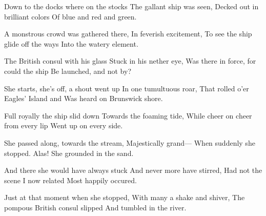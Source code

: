 \documentclass[11pt, a5paper, openright]{book}
\begin{document}
\begin{centering}
  Down to the docks where on the stocks\newline
  The gallant ship was seen,\newline
  Decked out in brilliant colors\newline
  Of blue and red and green.\par

  A monstrous crowd was gathered there,\newline
  In feverish excitement,\newline
  To see the ship glide off the ways\newline
  Into the watery element.\par

  The British consul with his glass\newline
  Stuck in his nether eye,
  Was there in force, for could the ship\newline
  Be launched, and not by?\par

  She starts, she's off, a shout went up\newline
  In one tumultuous roar,\newline
  That rolled o'er Eagles' Island and\newline
  Was heard on Brunswick shore.\par

  Full royally the ship slid down\newline
  Towards the foaming tide,\newline
  While cheer on cheer from every lip\newline
  Went up on every side.\par

  She passed along, towards the stream,\newline
  Majestically grand---\newline
  When suddenly she stopped.  Alas!\newline
  She grounded in the sand.\par

  And there she would have always stuck\newline
  And never more have stirred,\newline
  Had not the scene I now related\newline
  Most happily occured.\par

  Just at that moment when she stopped,\newline
  With many a shake and shiver,\newline
  The pompous British consul slipped\newline
  And tumbled in the river.\par


\end{centering}
\end{document}
